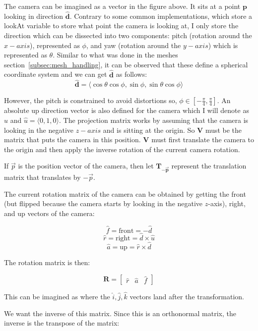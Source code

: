 The camera can be imagined as a vector in the figure above. It sits at a point $\mathbf{p}$ looking in direction {$\mathbf{\hat{d}}$}. Contrary to some common implementations, which store a lookAt variable to store what point the camera is looking at, I only store the direction which can be dissected into two components: pitch (rotation around the $x-axis$), represented as $\phi$, and yaw (rotation around the $y-axis$) which is represented as $\theta$. Similar to what was done in the meshes section~\ref{subsec:mesh_handling}, it can be observed that these define a spherical coordinate system and we can get $\mathbf{\hat{d}}$ as follows: \begin{equation}\mathbf{\hat{d}} = \langle \cos\theta\cos\phi, \sin\phi, \sin\theta\cos\phi \rangle\end{equation}

However, the pitch is constrained to avoid distortions so, $\phi \in [-\frac{\pi}{4}, \frac{\pi}{4}]$. An absolute up direction vector is also defined for the camera which I will denote as $\hat{u}$ and $\hat{u}=\langle0, 1, 0\rangle$. The projection matrix works by assuming that the camera is looking in the negative $z-axis$ and is sitting at the origin. So $\mathbf{V}$ must be the matrix that puts the camera in this position. $\mathbf{V}$ must first translate the camera to the origin and then apply the inverse rotation of the current camera rotation.

If $\vec{p}$ is the position vector of the camera, then let $\mathbf{T_{-\overrightarrow{p}}}$ represent the translation matrix that translates by $-{\vec{p}}$.


The current rotation matrix of the camera can be obtained by getting the front (but flipped because the camera starts by looking in the negative $z$-axis), right, and up vectors of the camera:

\[
\hat{f} = \text{front} = -\hat{d}
\]
\[
\hat{r} = \text{right} = \hat{d} \times \hat{u}
\]
\[
\hat{a} = \text{up} = \hat{r} \times \hat{d}
\]

The rotation matrix is then:

\[
\mathbf{R} = \begin{bmatrix} 
\hat{r} & \hat{a} & \hat{f} 
\end{bmatrix}
\]

This can be imagined as where the $\hat{i}, \hat{j}, \hat{k}$ vectors land after the transformation.

We want the inverse of this matrix. Since this is an orthonormal matrix, the inverse is the transpose of the matrix:

